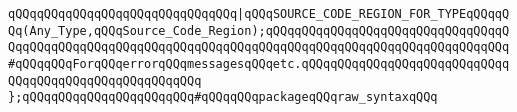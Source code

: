 \verb|qQQqqQQqqQQqqQQqqQQqqQQqqQQqqQQq|\verb#|qQQqSOURCE_CODE_REGION_FOR_TYPEqQQqqQQq(Any_Type,qQQqSource_Code_Region);qQQqqQQqqQQqqQQqqQQqqQQqqQQqqQQqqQQqqQQqqQQqqQQqqQQqqQQqqQQqqQQqqQQqqQQqqQQqqQQqqQQqqQQqqQQqqQQqqQQqqQQq#\verb|#qQQqqQQqForqQQqerrorqQQqmessagesqQQqetc.qQQqqQQqqQQqqQQqqQQqqQQqqQQqqQQqqQQqqQQqqQQqqQQqqQQqqQQq|\newline
\newline
\newline
\newline
\verb|};qQQqqQQqqQQqqQQqqQQqqQQq#qQQqqQQqpackageqQQqraw_syntaxqQQq|\newline
\newline
\newline

